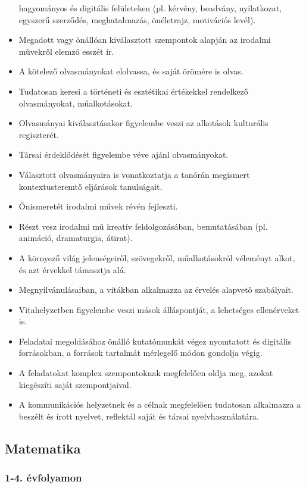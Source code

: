 \begin{itemize}
  hagyományos és digitális felületeken (pl. kérvény, beadvány,
  nyilatkozat, egyszerű szerződés, meghatalmazás, önéletrajz, motivációs
  levél).
\item
  Megadott vagy önállóan kiválasztott szempontok alapján az irodalmi
  művekről elemző esszét ír.
\item
  A kötelező olvasmányokat elolvassa, és saját örömére is olvas.
\item
  Tudatosan keresi a történeti és esztétikai értékekkel rendelkező
  olvasmányokat, műalkotásokat.
\item
  Olvasmányai kiválasztásakor figyelembe veszi az alkotások kulturális
  regiszterét.
\item
  Társai érdeklődését figyelembe véve ajánl olvasmányokat.
\item
  Választott olvasmányaira is vonatkoztatja a tanórán megismert
  kontextusteremtő eljárások tanulságait.
\item
  Önismeretét irodalmi művek révén fejleszti.
\item
  Részt vesz irodalmi mű kreatív feldolgozásában, bemutatásában (pl.
  animáció, dramaturgia, átirat).
\item
  A környező világ jelenségeiről, szövegekről, műalkotásokról véleményt
  alkot, és azt érvekkel támasztja alá.
\item
  Megnyilvánulásaiban, a vitákban alkalmazza az érvelés alapvető
  szabályait.
\item
  Vitahelyzetben figyelembe veszi mások álláspontját, a lehetséges
  ellenérveket is.
\item
  Feladatai megoldásához önálló kutatómunkát végez nyomtatott és
  digitális forrásokban, a források tartalmát mérlegelő módon gondolja
  végig.
\item
  A feladatokat komplex szempontoknak megfelelően oldja meg, azokat
  kiegészíti saját szempontjaival.
\item
  A kommunikációs helyzetnek és a célnak megfelelően tudatosan
  alkalmazza a beszélt és írott nyelvet, reflektál saját és társai
  nyelvhasználatára.
\end{itemize}

\hypertarget{matematika}{%
\subsection{Matematika}\label{matematika}}

\hypertarget{evfolyamon-24}{%
\subsubsection{1-4. évfolyamon}\label{evfolyamon-24}}

